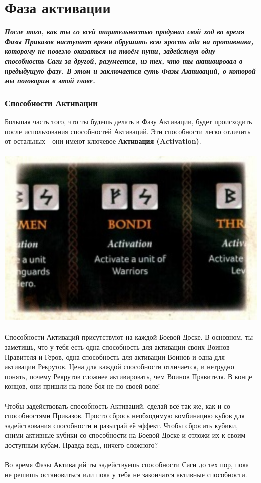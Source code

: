 \documentclass[a4paper,11pt,twoside]{article}
\begin{document}
\part{Фаза активации}
\textbf{\textit{После того, как ты со всей тщательностью продумал свой ход во время Фазы Приказов наступает время обрушить всю ярость ада на противника, которому не повезло оказаться на твоём пути, задействуя одну способность Саги за другой, разумеется, из тех, что ты активировал в предыдущую фазу. В этом и заключается суть Фазы Активаций, о которой мы поговорим в этой главе. }}
\section*{Способности Активации}
Большая часть того, что ты будешь делать в Фазу Активации, будет происходить после использования способностей Активаций. Эти способности легко отличить от остальных - они имеют ключевое \textbf{Активация (Activation)}. \\ \\ 
\includegraphics[width=1.0\textwidth]{pics/SagaActivationAbility} \\ \\
Способности Активаций присутствуют на каждой Боевой Доске. В основном, ты заметишь, что у тебя есть одна способность для активации своих Воинов Правителя и Геров, одна способность для активации Воинов и одна для активации Рекрутов. Цена для каждой способности отличается, и нетрудно понять, почему Рекрутов сложнее активировать, чем Воинов Правителя. В конце концов, они пришли на поле боя не по своей воле! \\ \\
Чтобы задействовать способность Активаций, сделай всё так же, как и со способностями Приказов. Просто сбрось необходимую комбинацию кубов для задействования способности и разыграй её эффект. Чтобы сбросить кубики, сними активные кубики со способности на Боевой Доске и отложи их к своим доступным кубам. Правда ведь, ничего сложного? \\ \\
Во время Фазы Активаций ты задействуешь способности Саги до тех пор, пока не решишь остановиться или пока у тебя не закончатся активные способности. 
\end{document}
